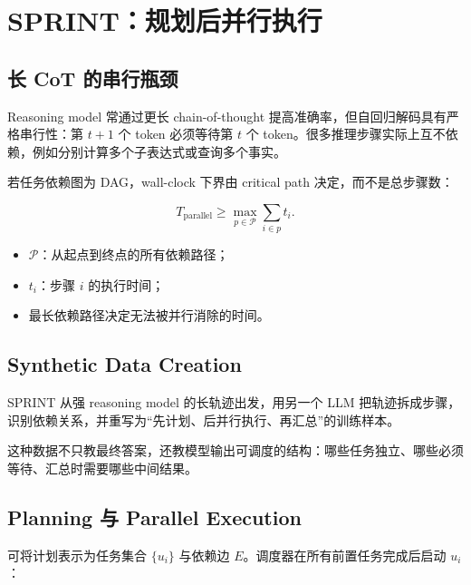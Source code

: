 \section{SPRINT：规划后并行执行}

\subsection{长 CoT 的串行瓶颈}

Reasoning model 常通过更长 chain-of-thought 提高准确率，但自回归解码具有严格串行性：第 $t+1$ 个 token 必须等待第 $t$ 个 token。很多推理步骤实际上互不依赖，例如分别计算多个子表达式或查询多个事实。


若任务依赖图为 DAG，wall-clock 下界由 critical path 决定，而不是总步骤数：

$$
T_{\mathrm{parallel}}\ge \max_{p\in\mathcal P}\sum_{i\in p} t_i.
$$

\begin{itemize}
    \item $\mathcal P$：从起点到终点的所有依赖路径；
    \item $t_i$：步骤 $i$ 的执行时间；
    \item 最长依赖路径决定无法被并行消除的时间。
\end{itemize}

\subsection{Synthetic Data Creation}

SPRINT 从强 reasoning model 的长轨迹出发，用另一个 LLM 把轨迹拆成步骤，识别依赖关系，并重写为“先计划、后并行执行、再汇总”的训练样本。


这种数据不只教最终答案，还教模型输出可调度的结构：哪些任务独立、哪些必须等待、汇总时需要哪些中间结果。

\subsection{Planning 与 Parallel Execution}


可将计划表示为任务集合 $\{u_i\}$ 与依赖边 $E$。调度器在所有前置任务完成后启动 $u_i$：

